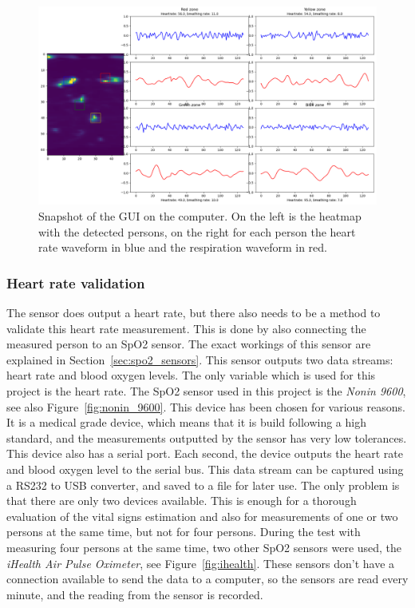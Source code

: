 \begin{figure}[ht]
    \centering
    \includegraphics[width=.95\textwidth]{figures/validation/4personen_testen_crop2.png}
    \caption{Snapshot of the GUI on the computer. On the left is the heatmap with the detected persons, on the right for each person the heart rate waveform in blue and the respiration waveform in red.}
    \label{fig:gui_computer}
\end{figure}

\subsubsection{Heart rate validation}
\label{sec:heartrate_validation}
The sensor does output a heart rate, but there also needs to be a method to validate this heart rate measurement. This is done by also connecting the measured person to an SpO2 sensor. The exact workings of this sensor are explained in Section~\ref{sec:spo2_sensors}. This sensor outputs two data streams: heart rate and blood oxygen levels. The only variable which is used for this project is the heart rate. The SpO2 sensor used in this project is the \emph{Nonin 9600}, see also Figure~\ref{fig:nonin_9600}. This device has been chosen for various reasons. It is a medical grade device, which means that it is build following a high standard, and the measurements outputted by the sensor has very low tolerances. This device also has a serial port. Each second, the device outputs the heart rate and blood oxygen level to the serial bus. This data stream can be captured using a RS232 to USB converter, and saved to a file for later use. The only problem is that there are only two devices available. This is enough for a thorough evaluation of the vital signs estimation and also for measurements of one or two persons at the same time, but not for four persons. During the test with measuring four persons at the same time, two other SpO2 sensors were used, the \emph{iHealth Air Pulse Oximeter}, see Figure~\ref{fig:ihealth}. These sensors don't have a connection available to send the data to a computer, so the sensors are read every minute, and the reading from the sensor is recorded. 

